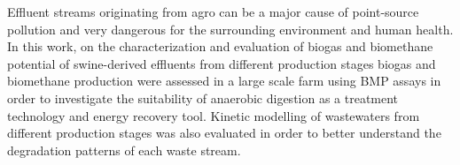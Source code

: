 Effluent streams originating from agro can be a major cause of point-source pollution and very dangerous for the surrounding environment and human health. In this work, on the characterization and evaluation of biogas and biomethane potential of swine-derived effluents from different production stages biogas and biomethane production were assessed in a large scale farm using BMP assays in order to investigate the suitability of anaerobic digestion as a treatment technology and energy recovery tool. Kinetic modelling of wastewaters from different production stages was also evaluated in order to better understand the degradation patterns of each waste stream.